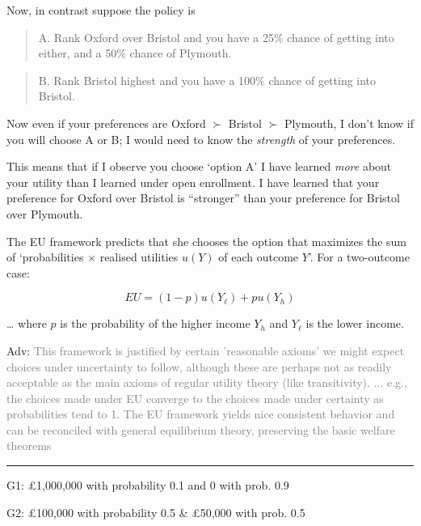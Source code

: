 \documentclass[]{article}
\begin{document}
\bigskip

Now, in contrast suppose the policy is

\begin{quote}
A. Rank Oxford over Bristol and you have a 25\% chance of getting into
either, and a 50\% chance of Plymouth.
\end{quote}

\begin{quote}
B. Rank Bristol highest and you have a 100\% chance of getting into
Bristol.
\end{quote}

Now even if your preferences are Oxford \(\succ\) Bristol \(\succ\)
Plymouth, I don't know if you will choose A or B; I would need to know
the \emph{strength} of your preferences.

\bigskip

This means that if I observe you choose `option A' I have learned
\emph{more} about your utility than I learned under open enrollment. I
have learned that your preference for Oxford over Bristol is
``stronger'' than your preference for Bristol over Plymouth.

\bigskip

The EU framework predicts that she chooses the option that maximizes the
sum of `probabilities \(\times\) realised utilities \(u(Y)\) of each
outcome \(Y\)'. For a two-outcome case:

\[EU = (1-p) u(Y_\ell) + p u(Y_h)\]

\ldots{} where \(p\) is the probability of the higher income \(Y_h\) and
\(Y_\ell\) is the lower income.

\bigskip

\textcolor{RawSienna}{Adv:}
\textcolor{gray}{This framework is justified by certain 'reasonable axioms' we might expect choices under uncertainty to follow,
although these are perhaps not as readily acceptable as the main axioms of regular utility theory (like transitivity).
... e.g., the choices made under EU converge to the choices made under certainty as probabilities tend to 1.
The EU framework yields nice consistent behavior and can be reconciled with general equilibrium theory, preserving the basic welfare theorems}

\begin{center}\rule{0.5\linewidth}{\linethickness}\end{center}

G1: \pounds1,000,000 with probability 0.1 and 0 with prob. 0.9

G2: \pounds100,000 with probability 0.5 \& \pounds50,000 with prob. 0.5
\end{document}
